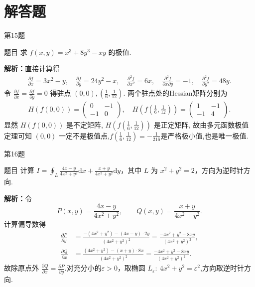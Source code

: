 \documentclass[aspectratio=169]{beamer}
\begin{document}
\section{解答题}

\begin{frame}{第15题}
\begin{block}{题目}
求 $f(x,y)=x^3+8y^3-xy$ 的极值.
\end{block}
\textbf{解析：}直接计算得
\begin{align*}
\frac{\partial f}{\partial x} = 3x^2 - y, \quad \frac{\partial f}{\partial y} = 24y^2 - x, \quad \frac{\partial^2 f}{\partial x^2} = 6x, \quad \frac{\partial^2 f}{\partial x \partial y} = -1, \quad \frac{\partial^2 f}{\partial y^2} = 48y.
\end{align*}
令 $\frac{\partial f}{\partial x} = \frac{\partial f}{\partial y} = 0$ 得驻点 $(0,0), \left( \frac{1}{6}, \frac{1}{12} \right)$. 两个驻点处的Hessian矩阵分别为
\begin{align*}
H(f(0,0)) = \begin{pmatrix} 0 & -1 \\ -1 & 0 \end{pmatrix}, \quad H\left( f\left( \frac{1}{6}, \frac{1}{12} \right) \right) = \begin{pmatrix} 1 & -1 \\ -1 & 4 \end{pmatrix}.
\end{align*}
显然 $H(f(0,0))$ 是不定矩阵, $H\left( f\left( \frac{1}{6}, \frac{1}{12} \right) \right)$ 是正定矩阵, 故由多元函数极值定理可知 $(0,0)$ 一定不是极值点,$f\left( \frac{1}{6}, \frac{1}{12} \right)=-\frac{1}{216}$是严格极小值,也是唯一极值.
\end{frame}

\begin{frame}{第16题}
\begin{block}{题目}
计算 $I=\oint_L \frac{4x-y}{4x^2+y^2}\mathrm{d}x+\frac{x+y}{4x^2+y^2}\mathrm{d}y$，其中 $L$ 为 $x^2+y^2=2$，方向为逆时针方向.
\end{block}
\textbf{解析：}令
\[
P(x,y)=\frac{4x-y}{4x^2+y^2},\qquad Q(x,y)=\frac{x+y}{4x^2+y^2}.
\]
计算偏导数得
\begin{align*}
\frac{\partial P}{\partial y}
&=\frac{-(4x^2+y^2)-(4x-y)\cdot 2y}{(4x^2+y^2)^2}
=\frac{-4x^2+y^2-8xy}{(4x^2+y^2)^2},\\
\frac{\partial Q}{\partial x}
&=\frac{(4x^2+y^2)-(x+y)\cdot 8x}{(4x^2+y^2)^2}
=\frac{-4x^2+y^2-8xy}{(4x^2+y^2)^2}.
\end{align*}
故除原点外 $\frac{\partial Q}{\partial x}=\frac{\partial P}{\partial y}$.对充分小的$\varepsilon>0$，取椭圆
$L_\varepsilon :\ 4x^2+y^2=\varepsilon^2$,方向取逆时针方向.
\end{frame}
\end{document}

